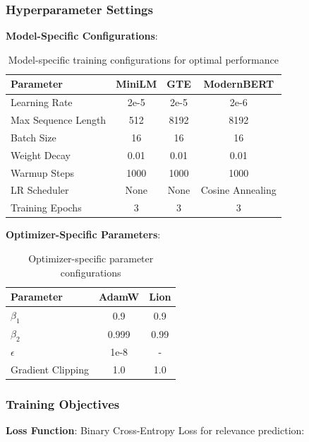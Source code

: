\subsubsection{Hyperparameter Settings}

\textbf{Model-Specific Configurations}:

\begin{table}[h!]
\centering
\begin{tabular}{|l|c|c|c|}
\hline
\textbf{Parameter} & \textbf{MiniLM} & \textbf{GTE} & \textbf{ModernBERT} \\
\hline
Learning Rate & 2e-5 & 2e-5 & 2e-6 \\
\hline
Max Sequence Length & 512 & 8192 & 8192 \\
\hline
Batch Size & 16 & 16 & 16 \\
\hline
Weight Decay & 0.01 & 0.01 & 0.01 \\
\hline
Warmup Steps & 1000 & 1000 & 1000 \\
\hline
LR Scheduler & None & None & Cosine Annealing \\
\hline
Training Epochs & 3 & 3 & 3 \\
\hline
\end{tabular}
\caption{Model-specific training configurations for optimal performance}
\label{tab:training_config}
\end{table}

\textbf{Optimizer-Specific Parameters}:

\begin{table}[h!]
\centering
\begin{tabular}{|l|c|c|}
\hline
\textbf{Parameter} & \textbf{AdamW} & \textbf{Lion} \\
\hline
$\beta_1$ & 0.9 & 0.9 \\
\hline
$\beta_2$ & 0.999 & 0.99 \\
\hline
$\epsilon$ & 1e-8 & - \\
\hline
Gradient Clipping & 1.0 & 1.0 \\
\hline
\end{tabular}
\caption{Optimizer-specific parameter configurations}
\label{tab:optimizer_config}
\end{table}

\subsubsection{Training Objectives}

\textbf{Loss Function}: Binary Cross-Entropy Loss for relevance prediction:

